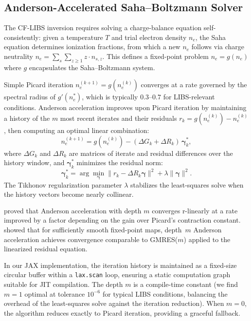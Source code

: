 \subsection{Anderson-Accelerated Saha--Boltzmann Solver}
\label{sec:anderson}

The CF-LIBS inversion requires solving a charge-balance equation self-consistently: given a temperature $T$ and trial electron density $n_e$, the Saha equation determines ionization fractions, from which a new $n_e$ follows via charge neutrality $n_e = \sum_s \sum_{z \geq 1} z \cdot n_{s,z}$.
This defines a fixed-point problem $n_e = g(n_e)$ where $g$ encapsulates the Saha--Boltzmann system.

Simple Picard iteration $n_e^{(k+1)} = g(n_e^{(k)})$ converges at a rate governed by the spectral radius of $g'(n_e^*)$, which is typically $0.3$--$0.7$ for LIBS-relevant conditions.
Anderson acceleration \citep{Walker2011} improves upon Picard iteration by maintaining a history of the $m$ most recent iterates and their residuals $r_k = g(n_e^{(k)}) - n_e^{(k)}$, then computing an optimal linear combination:
\begin{equation}
  n_e^{(k+1)} = g(n_e^{(k)}) - (\Delta G_k + \Delta R_k)\, \bm{\gamma}_k^*,
  \label{eq:anderson}
\end{equation}
where $\Delta G_k$ and $\Delta R_k$ are matrices of iterate and residual differences over the history window, and $\bm{\gamma}_k^*$ minimizes the residual norm:
\begin{equation}
  \bm{\gamma}_k^* = \arg\min_{\bm{\gamma}} \| r_k - \Delta R_k \bm{\gamma} \|^2 + \lambda \|\bm{\gamma}\|^2.
  \label{eq:anderson-ls}
\end{equation}
The Tikhonov regularization parameter $\lambda$ stabilizes the least-squares solve when the history vectors become nearly collinear.

\citet{Toth2015} proved that Anderson acceleration with depth $m$ converges r-linearly at a rate improved by a factor depending on the gain over Picard's contraction constant.
\citet{Evans2018} showed that for sufficiently smooth fixed-point maps, depth~$m$ Anderson acceleration achieves convergence comparable to GMRES($m$) applied to the linearized residual equation.

In our JAX implementation, the iteration history is maintained as a fixed-size circular buffer within a \texttt{lax.scan} loop, ensuring a static computation graph suitable for JIT compilation.
The depth $m$ is a compile-time constant (we find $m = 1$ optimal at tolerance $10^{-6}$ for typical LIBS conditions, balancing the overhead of the least-squares solve against the iteration reduction).
When $m = 0$, the algorithm reduces exactly to Picard iteration, providing a graceful fallback.


